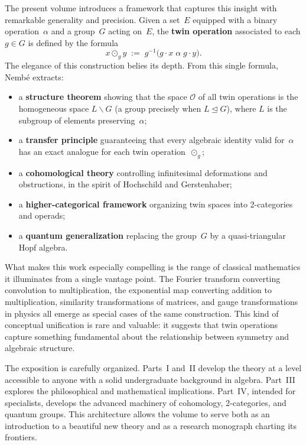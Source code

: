 \documentclass[11pt,a4paper,openany]{book}
\theoremstyle{plain}
\theoremstyle{definition}
\newcommand{\twing}[1]{\odot_{#1}}
\newcommand{\opspace}{\mathcal{O}}
\newcommand{\lingroup}{L}
\newcommand{\actspace}{E}
\newcommand{\groupG}{G}
\begin{document}
The present volume introduces a framework that captures this insight with remarkable generality and precision. Given a set~$\actspace$ equipped with a binary operation~$\alpha$ and a group~$\groupG$ acting on~$\actspace$, the \textbf{twin operation} associated to each $g \in \groupG$ is defined by the formula
\[
x \twing{g} y \;:=\; g^{-1}\!\big(g \cdot x \;\alpha\; g \cdot y\big).
\]
The elegance of this construction belies its depth. From this single formula, Nemb\'e extracts:
\begin{itemize}
    \item a \textbf{structure theorem} showing that the space $\opspace$ of all twin operations is the homogeneous space $\lingroup\backslash\groupG$ (a group precisely when $\lingroup\trianglelefteq\groupG$), where $\lingroup$ is the subgroup of elements preserving~$\alpha$;
    \item a \textbf{transfer principle} guaranteeing that every algebraic identity valid for~$\alpha$ has an exact analogue for each twin operation~$\twing{g}$;
    \item a \textbf{cohomological theory} controlling infinitesimal deformations and obstructions, in the spirit of Hochschild and Gerstenhaber;
    \item a \textbf{higher-categorical framework} organizing twin spaces into 2-categories and operads;
    \item a \textbf{quantum generalization} replacing the group~$\groupG$ by a quasi-triangular Hopf algebra.
\end{itemize}

What makes this work especially compelling is the range of classical mathematics it illuminates from a single vantage point. The Fourier transform converting convolution to multiplication, the exponential map converting addition to multiplication, similarity transformations of matrices, and gauge transformations in physics all emerge as special cases of the same construction. This kind of conceptual unification is rare and valuable: it suggests that twin operations capture something fundamental about the relationship between symmetry and algebraic structure.

The exposition is carefully organized. Parts~I and~II develop the theory at a level accessible to anyone with a solid undergraduate background in algebra. Part~III explores the philosophical and mathematical implications. Part~IV, intended for specialists, develops the advanced machinery of cohomology, 2-categories, and quantum groups. This architecture allows the volume to serve both as an introduction to a beautiful new theory and as a research monograph charting its frontiers.
\end{document}
